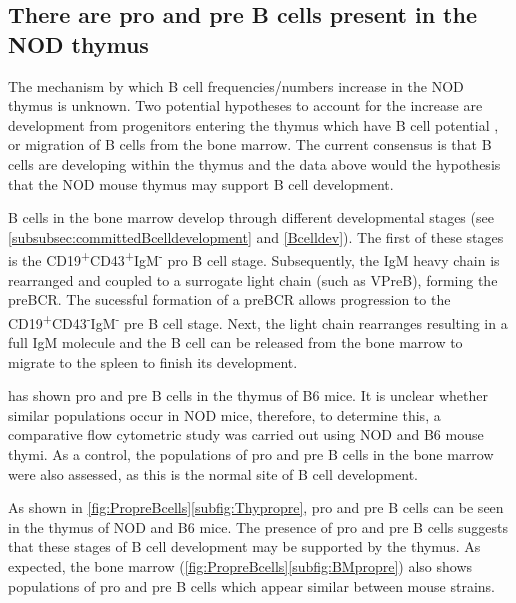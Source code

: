 \subsection{There are pro and pre B cells present in the NOD thymus}
\label{subsec:proandpre}

The mechanism by which B cell frequencies/numbers increase in the NOD thymus is unknown. 
Two potential hypotheses to account for the increase are development from progenitors entering the thymus which have B cell potential \citep{Porritt2004, Akashi2000}, or migration of B cells from the bone marrow.
The current consensus is that B cells are developing within the thymus and the data above would the hypothesis that the NOD mouse thymus may support B cell development. 

B cells in the bone marrow develop through different developmental stages (see \cref{subsubsec:committedBcelldevelopment} and \cref{Bcelldev}).
The first of these stages is the CD19\textsuperscript{+}CD43\textsuperscript{+}IgM\textsuperscript{-} pro B cell stage.
Subsequently, the IgM heavy chain is rearranged and coupled to a surrogate light chain (such as VPreB), forming the preBCR.
The sucessful formation of a preBCR allows progression to the CD19\textsuperscript{+}CD43\textsuperscript{-}IgM\textsuperscript{-} pre B cell stage.
Next, the light chain rearranges resulting in a full IgM molecule and the B cell can be released from the bone marrow to migrate to the spleen to finish its development.


\citet{Akashi2000} has shown pro and pre B cells in the thymus of B6 mice.
It is unclear whether similar populations occur in NOD mice, therefore, to determine this, a comparative flow cytometric study was carried out using NOD and B6 mouse thymi.
As a control, the populations of pro and pre B cells in the bone marrow were also assessed, as this is the normal site of B cell development.

As shown in \cref{fig:PropreBcells}\ref{subfig:Thypropre}, pro and pre B cells can be seen in the thymus of NOD and B6 mice.
The presence of pro and pre B cells suggests that these stages of B cell development may be supported by the thymus. 
As expected, the bone marrow (\cref{fig:PropreBcells}\ref{subfig:BMpropre}) also shows populations of pro and pre B cells which appear similar between mouse strains.


